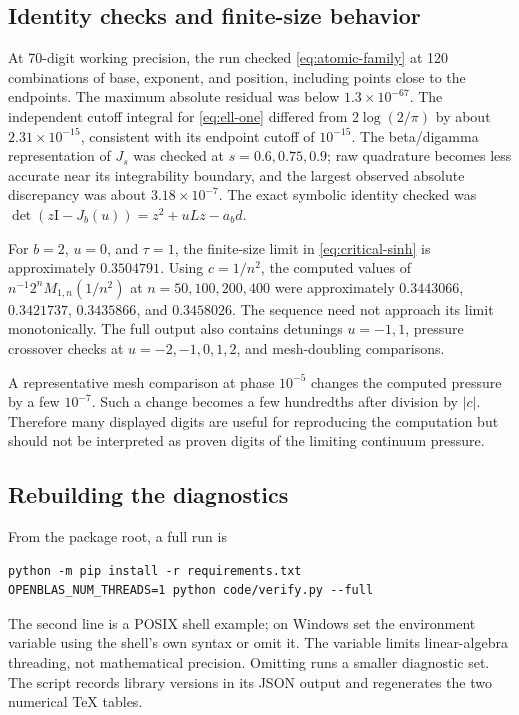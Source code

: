 \documentclass[11pt,a4paper]{article}
\numberwithin{equation}{section}
\theoremstyle{definition}
\theoremstyle{remark}
\newcommand{\Id}{\mathrm I}
\newcommand{\code}[1]{\texttt{\detokenize{#1}}}
\begin{document}
\subsection{Identity checks and finite-size behavior}
At 70-digit working precision, the run checked
\cref{eq:atomic-family} at 120 combinations of base, exponent, and
position, including points close to the endpoints. The maximum absolute
residual was below $1.3\times10^{-67}$. The independent cutoff integral
for \cref{eq:ell-one} differed from $2\log(2/\pi)$ by about
$2.31\times10^{-15}$, consistent with its endpoint cutoff of $10^{-15}$.
The beta/digamma representation of $J_s$ was checked at $s=0.6,0.75,0.9$;
raw quadrature becomes less accurate near its integrability boundary,
and the largest observed absolute discrepancy was about
$3.18\times10^{-7}$. The exact symbolic identity checked was
$\det(z\Id-J_b(u))=z^2+uLz-a_bd$.

For $b=2$, $u=0$, and $\tau=1$, the finite-size limit in
\cref{eq:critical-sinh} is approximately $0.3504791$.
Using $c=1/n^2$, the computed values of
$n^{-1}2^nM_{1,n}(1/n^2)$ at $n=50,100,200,400$ were approximately
$0.3443066$, $0.3421737$, $0.3435866$, and $0.3458026$.
The sequence need not approach its limit monotonically. The full output
also contains detunings $u=-1,1$, pressure crossover checks at
$u=-2,-1,0,1,2$, and mesh-doubling comparisons.

A representative mesh comparison at phase $10^{-5}$ changes the
computed pressure by a few $10^{-7}$. Such a change becomes a few
hundredths after division by $|c|$. Therefore many displayed digits are
useful for reproducing the computation but should not be interpreted as
proven digits of the limiting continuum pressure.

\subsection{Rebuilding the diagnostics}
From the package root, a full run is
\begin{verbatim}
python -m pip install -r requirements.txt
OPENBLAS_NUM_THREADS=1 python code/verify.py --full
\end{verbatim}
The second line is a POSIX shell example; on Windows set the environment
variable using the shell's own syntax or omit it. The variable limits
linear-algebra threading, not mathematical precision. Omitting
\code{--full} runs a smaller diagnostic set. The script records library
versions in its JSON output and regenerates the two numerical TeX tables.
\end{document}
